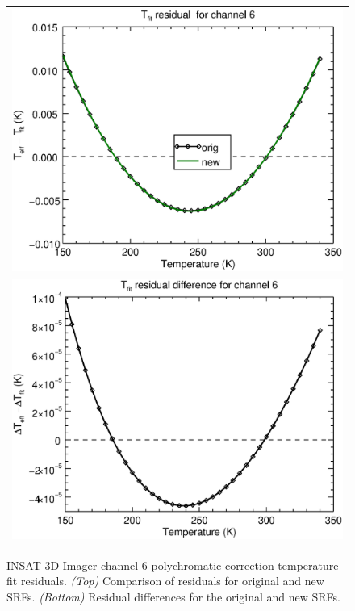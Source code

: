 \begin{figure}[H]
  \centering
  \begin{tabular}{c}
    \includegraphics[scale=0.55]{graphics/imgr/tfit/imgr_insat3d-6.tfit.eps} \\
    \includegraphics[scale=0.55]{graphics/imgr/tfit/imgr_insat3d-6.tfit.difference.eps}
  \end{tabular}
  \caption{INSAT-3D Imager channel 6 polychromatic correction temperature fit residuals. \emph{(Top)} Comparison of residuals for original and new SRFs. \emph{(Bottom)} Residual differences for the original and new SRFs.}
  \label{fig:imgr_ch6_tfit}
\end{figure}


